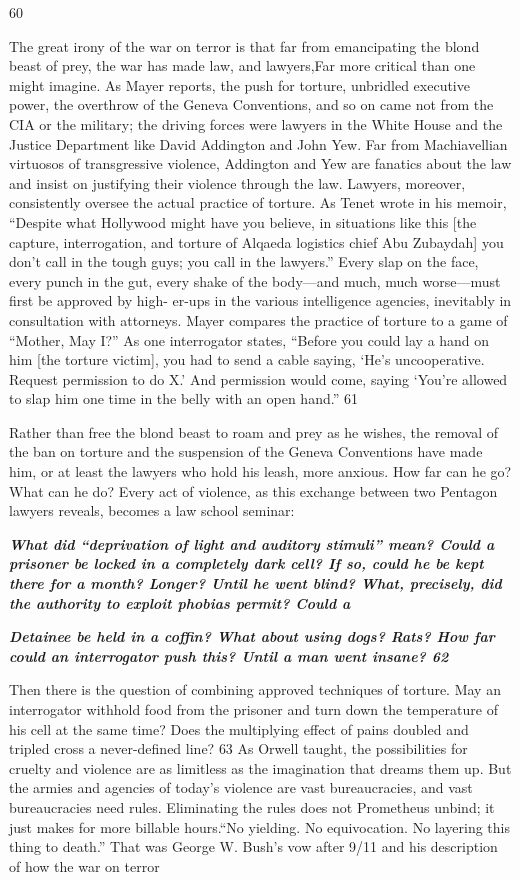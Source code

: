 {\color{blue} 60 } {\par} The great irony of the war on terror is that far from emancipating the blond beast of prey, the war has made law, and lawyers,Far more critical than one might imagine. As Mayer reports, the push for torture, unbridled executive power, the overthrow of the Geneva Conventions, and so on came not from the CIA or the military; the driving forces were lawyers in the White House and the Justice Department like David Addington and John Yew. Far from Machiavellian virtuosos of transgressive violence, Addington and Yew are fanatics about the law and insist on justifying their violence through the law. Lawyers, moreover, consistently oversee the actual practice of torture. As Tenet wrote in his memoir, “Despite what Hollywood might have you believe, in situations like this [the capture, interrogation, and torture of Alqaeda logistics chief Abu Zubaydah] you don’t call in the tough guys; you call in the lawyers.” Every slap on the face, every punch in the gut, every shake of the body—and much, much worse—must first be approved by high- er-ups in the various intelligence agencies, inevitably in consultation with attorneys. Mayer compares the practice of torture to a game of “Mother, May I?” As one interrogator states, “Before you could lay a hand on him [the torture victim], you had to send a cable saying, ‘He’s uncooperative. Request permission to do X.’ And permission would come, saying ‘You’re allowed to slap him one time in the belly with an open hand.” {\color{blue} 61 } {\par} Rather than free the blond beast to roam and prey as he wishes, the removal of the ban on torture and the suspension of the Geneva Conventions have made him, or at least the lawyers who hold his leash, more anxious. How far can he go? What can he do? Every act of violence, as this exchange between two Pentagon lawyers reveals, becomes a law school seminar:{\par} {\textbf{\textit{What did “deprivation of light and auditory stimuli” mean? Could a prisoner be locked in a completely dark cell? If so, could he be kept there for a month? Longer? Until he went blind? What, precisely, did the authority to exploit phobias permit? Could a} } }{\par} {\par} {\textbf{\textit{Detainee be held in a coffin? What about using dogs? Rats? How far could an interrogator push this? Until a man went insane? 62} } }{\par} Then there is the question of combining approved techniques of torture. May an interrogator withhold food from the prisoner and turn down the temperature of his cell at the same time? Does the multiplying effect of pains doubled and tripled cross a never-defined line? {\color{blue} 63 } As Orwell taught, the possibilities for cruelty and violence are as limitless as the imagination that dreams them up. But the armies and agencies of today’s violence are vast bureaucracies, and vast bureaucracies need rules. Eliminating the rules does not Prometheus unbind; it just makes for more billable hours.“No yielding. No equivocation. No layering this thing to death.” That was George W. Bush’s vow after 9/11 and his description of how the war on terror 
